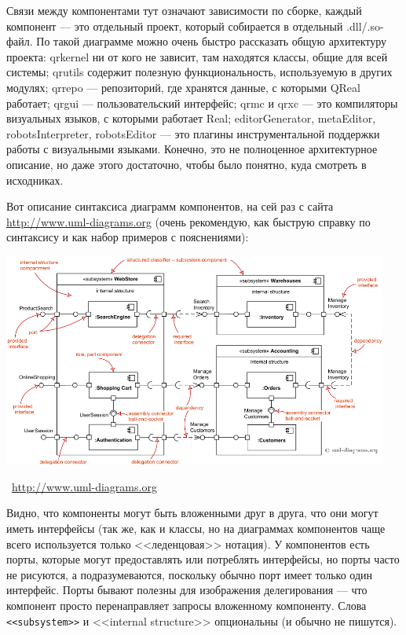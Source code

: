 \documentclass[a5paper]{article}
\newcommand{\attribution}[1] {
    \vspace{-5mm}\begin{flushright}\begin{scriptsize}\textcolor{gray}{\textcopyright\, #1}\end{scriptsize}\end{flushright}
}
\begin{document}
Связи между компонентами тут означают зависимости по сборке, каждый компонент --- это отдельный проект, который собирается в отдельный .dll/.so-файл. По такой диаграмме можно очень быстро рассказать общую архитектуру проекта: qrkernel ни от кого не зависит, там находятся классы, общие для всей системы; qrutils содержит полезную функциональность, используемую в других модулях; qrrepo --- репозиторий, где хранятся данные, с которыми QReal работает; qrgui --- пользовательский интерфейс; qrmc и qrxc --- это компиляторы визуальных языков, с которыми работает Real; editorGenerator, metaEditor, robotsInterpreter, robotsEditor --- это плагины инструментальной поддержки работы с визуальными языками. Конечно, это не полноценное архитектурное описание, но даже этого достаточно, чтобы было понятно, куда смотреть в исходниках.

Вот описание синтаксиса диаграмм компонентов, на сей раз с сайта \url{http://www.uml-diagrams.org} (очень рекомендую, как быструю справку по синтаксису и как набор примеров с пояснениями):

\begin{center}
    \includegraphics[width=0.95\textwidth]{componentDiagramsOverview.png}
    \attribution{\url{http://www.uml-diagrams.org}}
\end{center}

Видно, что компоненты могут быть вложенными друг в друга, что они могут иметь интерфейсы (так же, как и классы, но на диаграммах компонентов чаще всего используется только <<леденцовая>> нотация). У компонентов есть порты, которые могут предоставлять или потреблять интерфейсы, но порты часто не рисуются, а подразумеваются, поскольку обычно порт имеет только один интерфейс. Порты бывают полезны для изображения делегирования --- что компонент просто перенаправляет запросы вложенному компоненту. Слова \verb|<<subsystem>>| и <<internal structure>> опциональны (и обычно не пишутся).
\end{document}
